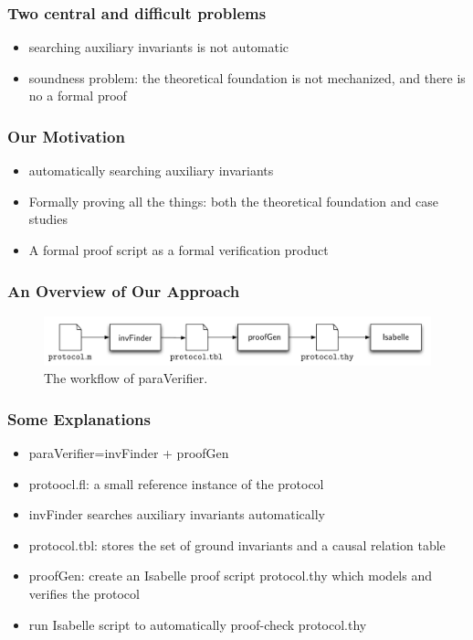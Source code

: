 \documentclass{beamer}
\begin{document}
\begin{frame}\frametitle{Two central and difficult problems}
\begin{itemize}
\item  searching auxiliary invariants is not automatic
\item  soundness problem: the theoretical foundation is not mechanized, and there is no  a formal proof
\end{itemize}

\end{frame}

\begin{frame}\frametitle{Our Motivation}

\begin{itemize}
\item automatically searching  auxiliary invariants
\item Formally proving all the things: both the theoretical foundation and case studies
\item A formal proof script as a formal verification product
\end{itemize}
\end{frame}


\begin{frame}\frametitle{An Overview of Our Approach}


\begin{figure}[!t]
\centering %
\vspace{-0.8cm}
\includegraphics[width=1.0\textwidth]{paraVerifierWorkFlow.pdf}
\vspace{-0.6cm}
\caption{The workflow of {\sf paraVerifier}.}
\label{fig:arch}
\end{figure}
\end{frame}

\begin{frame}\frametitle{Some Explanations}

\begin{itemize}
\item {\sf paraVerifier}={\sf invFinder} + {\sf proofGen}

\item protoocl.fl: a small reference instance of the   protocol


\item {\sf invFinder} searches auxiliary invariants automatically

\item   protocol.tbl:  stores the set of ground invariants and a causal relation table

\item {\sf proofGen}: create an Isabelle proof script {\sf protocol.thy} which models and verifies the protocol

\item run Isabelle script to automatically proof-check {\sf protocol.thy}
\end{itemize}

\end{frame}
\end{document}
